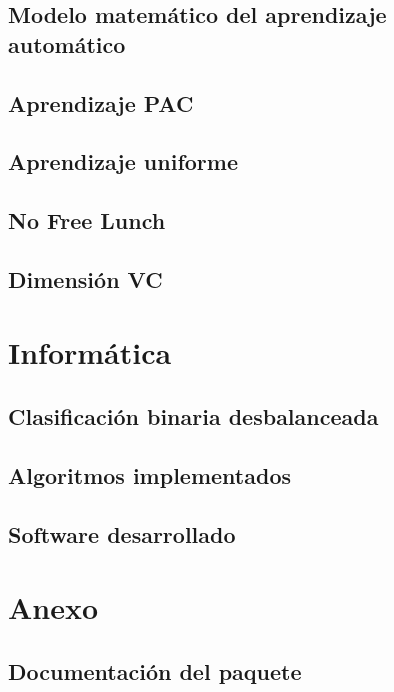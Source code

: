 \documentclass[dottedtoc, headinclude, footinclude=true]{scrreprt}
\begin{document}
  \chapter{Modelo matemático del aprendizaje automático}
    
  \chapter{Aprendizaje PAC}
    
  \chapter{Aprendizaje uniforme}
    
  \chapter{No Free Lunch}
    
  \chapter{Dimensión VC}
    
  
\part{Informática}
  \chapter{Clasificación binaria desbalanceada}
    
  \chapter{Algoritmos implementados}
    
    
    
    
    
  \chapter{Software desarrollado}
    

\part*{Anexo}
  \chapter*{Documentación del paquete}
    


\end{document}
